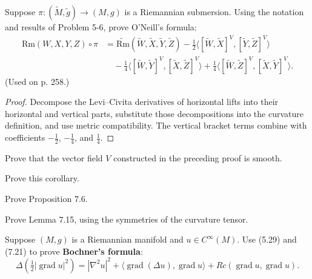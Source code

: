 \begin{exercise}
\label{prob:oneill-formula}
Suppose $\pi : (\tilde{M}, \tilde{g}) \to (M, g)$ is a Riemannian submersion. Using the notation and results of Problem 5-6, prove O'Neill's formula:
\begin{align*}
\mathrm{Rm}(W, X, Y, Z) \circ \pi &= \widetilde{\mathrm{Rm}}(\tilde{W}, \tilde{X}, \tilde{Y}, \tilde{Z}) - \frac{1}{2}\langle[\tilde{W}, \tilde{X}]^V, [\tilde{Y}, \tilde{Z}]^V\rangle \\
&\quad - \frac{1}{4}\langle[\tilde{W}, \tilde{Y}]^V, [\tilde{X}, \tilde{Z}]^V\rangle + \frac{1}{4}\langle[\tilde{W}, \tilde{Z}]^V, [\tilde{X}, \tilde{Y}]^V\rangle.
\end{align*}
(Used on p. 258.)
\end{exercise}

\begin{proof}
\sketch Decompose the Levi--Civita derivatives of horizontal lifts into their
horizontal and vertical parts, substitute those decompositions into the
curvature definition, and use metric compatibility. The vertical bracket
terms combine with coefficients $-\frac12$, $-\frac14$, and $\frac14$.
\end{proof}

\begin{exercise}
\label{exer:constructed-vector-field-smooth}
Prove that the vector field $V$ constructed in the preceding proof is smooth.
\end{exercise}

\begin{exercise}
\label{exer:prove-cotton-tensor-vanishes}
Prove this corollary.
\end{exercise}

\begin{exercise}
\label{exer:prove-curvature-isometry}
Prove Proposition 7.6.
\end{exercise}

\begin{exercise}
\label{exer:ricci-symmetries-proof}
Prove Lemma 7.15, using the symmetries of the curvature tensor.
\end{exercise}

\begin{exercise}
\label{prob:bochner-formula}
Suppose $(M, g)$ is a Riemannian manifold and $u \in C^\infty(M)$. Use (5.29) and (7.21) to prove \textbf{Bochner's formula}:
\[
\Delta\left(\tfrac{1}{2} |\operatorname{grad} u|^2\right) = |\nabla^2 u|^2 + \langle \operatorname{grad}(\Delta u), \operatorname{grad} u \rangle + Rc(\operatorname{grad} u, \operatorname{grad} u).
\]
\end{exercise}

